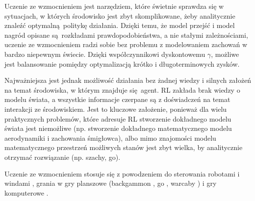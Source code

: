Uczenie ze wzmocnieniem jest narzędziem, które świetnie sprawdza się w sytuacjach, w których środowisko jest zbyt skomplikowane, żeby analitycznie znaleźć optymalną politykę działania. Dzięki temu, że model przejść i model nagród opisane są rozkładami prawdopodobieństwa, a nie stałymi zależnościami, uczenie ze wzmocnieniem radzi sobie bez problemu z modelowaniem zachowań w bardzo niepewnym świecie. Dzięki współczynnikowi dyskontowemu $\gamma$, możliwe jest balansowanie pomiędzy optymalizacją krótko i długoterminowych zysków.

Najważniejsza jest jednak możliwość działania bez żadnej wiedzy i silnych założeń na temat środowiska, w którym znajduje się agent. RL zakłada brak wiedzy o modelu świata, a wszystkie informacje czerpane są z doświadczeń na temat interakcji ze środowiskiem. Jest to kluczowe założenie, ponieważ dla wielu praktycznych problemów, które adresuje RL stworzenie dokładnego modelu świata jest niemożliwe (np. stworzenie dokładnego matematycznego modelu aerodynamiki i zachowania śmigłowca), albo mimo znajomości modelu matematycznego przestrzeń możliwych stanów jest zbyt wielka, by analitycznie otrzymać rozwiązanie (np. szachy, go).

Uczenie ze wzmocnieniem stosuje się z powodzeniem do sterowania robotami \cite{Mataric94rewardfunctions} i windami \cite{Crites96improvingelevator}, grania w gry planszowe (backgammon \cite{Tesauro1992451}, \break go \cite{Silver_2016}, warcaby \cite{Samuel:1959:SML:1661923.1661924}) i gry komputerowe \cite{mnih2015human}.




